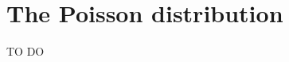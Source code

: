 \documentclass[../../../main.tex]{subfiles}
\begin{document}
\chapter{The Poisson distribution}

TO DO
\end{document}
